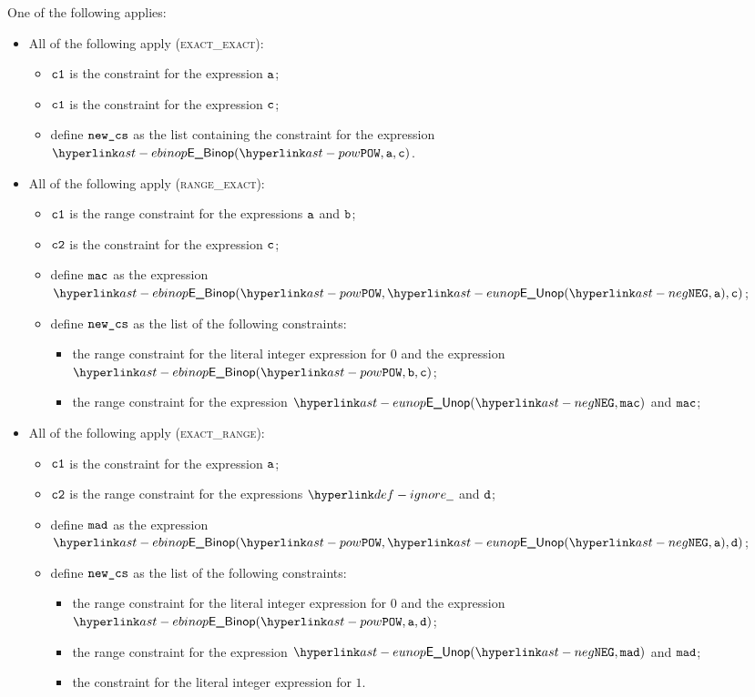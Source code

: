 \ProseParagraph
One of the following applies:
\begin{itemize}
  \item All of the following apply (\textsc{exact\_exact}):
  \begin{itemize}
    \item $\texttt{c1}$ is the constraint for the expression $\texttt{a}$;
    \item $\texttt{c1}$ is the constraint for the expression $\texttt{c}$;
    \item define $\texttt{new\_cs}$ as the list containing the constraint
    for the expression \\ $\EBinop(\POW, \va, \vc)$.
  \end{itemize}

  \item All of the following apply (\textsc{range\_exact}):
  \begin{itemize}
    \item $\texttt{c1}$ is the range constraint for the expressions $\texttt{a}$ and $\texttt{b}$;
    \item $\texttt{c2}$ is the constraint for the expression $\texttt{c}$;
    \item define $\texttt{mac}$ as the expression $\EBinop(\POW, \EUnop(\NEG, \va), \vc)$;
    \item define $\texttt{new\_cs}$ as the list of the following constraints:
    \begin{itemize}
      \item the range constraint for the literal integer expression for $0$ and the expression
            $\EBinop(\POW, \vb, \vc)$;
      \item the range constraint for the expression $\EUnop(\NEG, \vmac)$ and $\texttt{mac}$;
    \end{itemize}
  \end{itemize}

  \item All of the following apply (\textsc{exact\_range}):
  \begin{itemize}
    \item $\texttt{c1}$ is the constraint for the expression $\texttt{a}$;
    \item $\texttt{c2}$ is the range constraint for the expressions $\Ignore$ and $\texttt{d}$;
    \item define $\texttt{mad}$ as the expression $\EBinop(\POW, \EUnop(\NEG, \va), \vd)$;
    \item define $\texttt{new\_cs}$ as the list of the following constraints:
    \begin{itemize}
      \item the range constraint for the literal integer expression for $0$ and the expression
            $\EBinop(\POW, \va, \vd)$;
      \item the range constraint for the expression $\EUnop(\NEG, \vmad)$ and $\texttt{mad}$;
      \item the constraint for the literal integer expression for $1$.
    \end{itemize}
  \end{itemize}


\end{itemize}
